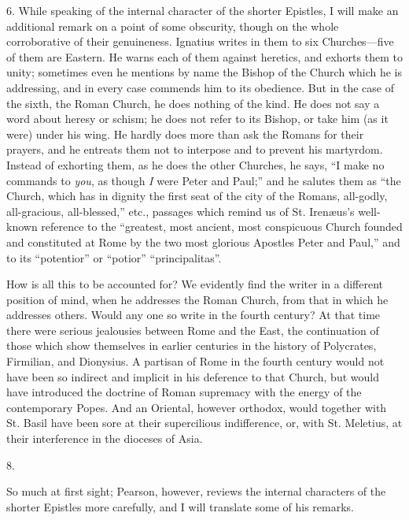 6. While speaking of the
internal character of the shorter Epistles, I will make an additional
remark on a point of some obscurity, though on the whole corroborative
of their genuineness. Ignatius writes in them to six Churches—five
of them are Eastern. He warns each of them against heretics, and
exhorts them to unity; sometimes even he mentions by name the Bishop
of the Church which he is addressing, and in every case commends him
to its obedience. But in the case of the sixth, the Roman Church, he
does nothing of the kind. He does not say a word about heresy or
schism; he does not refer to its Bishop, or take him (as it were)
under his wing. He hardly does more than ask the Romans for their
prayers, and he entreats them not to interpose and to prevent his
martyrdom. Instead of exhorting them, as he does the other Churches,
he says, ``I make no commands to \emph{you}, as though \emph{I} were
Peter and Paul;'' and he salutes them as ``the Church, which has in
dignity the first seat of the city of the Romans, all-godly,
all-gracious, all-blessed,'' etc., passages which remind us of
St. Irenæus's well-known reference to the ``greatest, most ancient,
most conspicuous Church founded and constituted at Rome by the two
most glorious Apostles Peter and Paul,'' and to its ``potentior'' or ``potior''
``principalitas''.

How is all this to be
accounted for? We evidently find the writer in a different position of
mind, when he addresses the Roman Church, from that in which he
addresses others. Would any one so write in the fourth century? At
that time there were serious jealousies between Rome and the East, the
continuation of those which show themselves in earlier centuries in
the history of Polycrates, Firmilian, and Dionysius. A partisan of
Rome in the fourth century would not have been so indirect and
implicit in his deference to that Church, but would have introduced
the doctrine of Roman supremacy with the energy of the contemporary
Popes. And an Oriental, however orthodox, would together with St.
Basil have been sore at their supercilious indifference, or, with St.
Meletius, at their interference in the dioceses of Asia.

8.

So much at first sight;
Pearson, however, reviews the internal characters of the shorter
Epistles more carefully, and I will translate some of his remarks.

